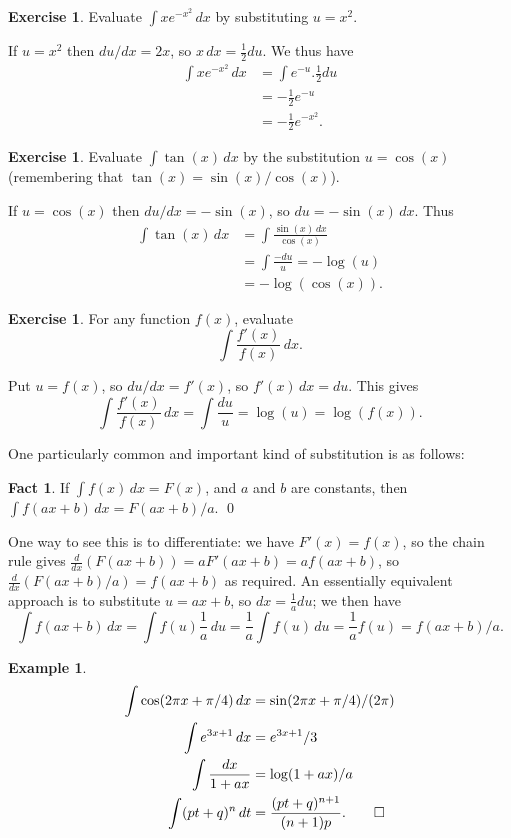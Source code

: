 \documentclass[a4paper]{book}
\theoremstyle{definition}
\newtheorem{fact}[theorem]{Fact}
\newtheorem{example}[theorem]{Example}
\newtheorem{exercise}[theorem]{Exercise}
\renewenvironment{solution}{\SolutionInline}{\endSolutionInline}
\begin{document}
\begin{exercise}
 Evaluate $\int xe^{-x^2}\,dx$ by substituting $u=x^2$.
\end{exercise}
\begin{solution}
 If $u=x^2$ then $du/dx=2x$, so $x\,dx=\frac{1}{2}du$.  We thus have
 \begin{align*}
  \int xe^{-x^2}\,dx &= \int e^{-u}.\tfrac{1}{2}du \\ 
                     &= -\tfrac{1}{2}e^{-u} \\
                     &= -\tfrac{1}{2}e^{-x^2}.
 \end{align*}
\end{solution}

\begin{exercise}
 Evaluate $\int\tan(x)\,dx$ by the substitution $u=\cos(x)$
 (remembering that $\tan(x)=\sin(x)/\cos(x)$).
\end{exercise}
\begin{solution}
 If $u=\cos(x)$ then $du/dx=-\sin(x)$, so $du=-\sin(x)\,dx$.  Thus
 \begin{align*}
  \int\tan(x)\,dx &= \int\frac{\sin(x)\,dx}{\cos(x)} \\
                  &= \int\frac{-du}{u} = -\log(u) \\
                  &= -\log(\cos(x)).
 \end{align*}
\end{solution}

\begin{exercise}
 For any function $f(x)$, evaluate
 \[ \int \frac{f'(x)}{f(x)}\,dx. \]
\end{exercise}
\begin{solution}
 Put $u=f(x)$, so $du/dx=f'(x)$, so $f'(x)\,dx=du$.  This gives 
 \[ \int \frac{f'(x)}{f(x)}\,dx = 
     \int \frac{du}{u} = \log(u) = \log(f(x)).
 \]
\end{solution}


One particularly common and important kind of substitution is as
follows:
\begin{fact}
 If $\int f(x)\,dx=F(x)$, and $a$ and $b$ are constants, then
 $\int f(ax+b)\,dx=F(ax+b)/a$. \qed
\end{fact}
One way to see this is to differentiate: we have $F'(x)=f(x)$, so the
chain rule gives $\frac{d}{dx}(F(ax+b))=aF'(ax+b)=af(ax+b)$, so 
$\frac{d}{dx}(F(ax+b)/a)=f(ax+b)$ as required.  An essentially
equivalent approach is to substitute $u=ax+b$, so $dx=\frac{1}{a}du$;
we then have
\[ \int f(ax+b)\,dx = \int f(u)\frac{1}{a}\,du = 
    \frac{1}{a}\int f(u)\,du = \frac{1}{a}f(u) = f(ax+b)/a.
\]
\begin{example}
 \begin{align*}
  \int \cos(2\pi x + \pi/4)\,dx &= \sin(2\pi x+\pi/4)/(2\pi) \\
  \int e^{3x+1}\,dx &= e^{3x+1}/3 \\
  \int \frac{dx}{1+ax} &= \log(1+ax)/a \\
  \int (pt+q)^n\,dt &= \frac{(pt+q)^{n+1}}{(n+1)p}.  \qed
 \end{align*}
\end{example}
\end{document}
